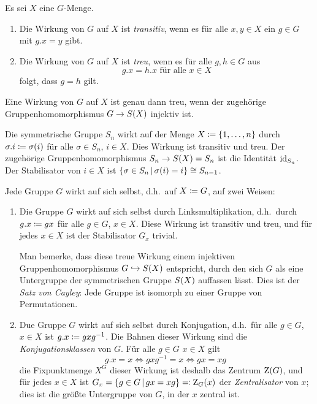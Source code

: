 \begin{definition}
  Es sei $X$ eine $G$-Menge.
  \begin{enumerate}
    \item
      Die Wirkung von $G$ auf $X$ ist \emph{transitiv}, wenn es für alle $x, y \in X$ ein $g \in G$ mit $g.x = y$ gibt.
    \item
      Die Wirkung von $G$ auf $X$ ist \emph{treu}, wenn es für alle $g, h \in G$ aus
      \[
        \text{$g.x = h.x$ für alle $x \in X$}
      \]
      folgt, dass $g = h$ gilt.
  \end{enumerate}
\end{definition}

\begin{remark}
  Eine Wirkung von $G$ auf $X$ ist genau dann treu, wenn der zugehörige Gruppenhomomorphismus $G \to S(X)$ injektiv ist.
\end{remark}

\begin{example}
  Die symmetrische Gruppe $S_n$ wirkt auf der Menge $X \coloneqq \{1, \dotsc, n\}$ durch $\sigma.i \coloneqq \sigma(i)$ für alle $\sigma \in S_n$, $i \in X$.
  Dies Wirkung ist transitiv und treu.
  Der zugehörige Gruppenhomomorphismus $S_n \to S(X) = S_n$ ist die Identität $\operatorname{id}_{S_n}$.
  Der Stabilisator von $i \in X$ ist $\{ \sigma \in S_n \suchthat \sigma(i) = i \} \cong S_{n-1}$.
\end{example}

\begin{example}
  Jede Gruppe $G$ wirkt auf sich selbst, d.h.\ auf $X \coloneqq G$, auf zwei Weisen:
  \begin{enumerate}
    \item
      Die Gruppe $G$ wirkt auf sich selbst durch Linksmultiplikation, d.h.\ durch $g.x \coloneqq gx$ für alle $g \in G$, $x \in X$.
      Diese Wirkung ist transitiv und treu, und für jedes $x \in X$ ist der Stabilisator $G_x$ trivial.
      
      Man bemerke, dass diese treue Wirkung einem injektiven Gruppenhomomorphismus $G \hookrightarrow S(X)$ entspricht, durch den sich $G$ als eine Untergruppe der symmetrischen Gruppe $S(X)$ auffassen lässt.
      Dies ist der \emph{Satz von Cayley}:
      Jede Gruppe ist isomorph zu einer Gruppe von Permutationen.
    \item
      Due Gruppe $G$ wirkt auf sich selbst durch Konjugation, d.h.\ für alle $g \in G$, $x \in X$ ist $g.x \coloneqq gxg^{-1}$.
      Die Bahnen dieser Wirkung sind die \emph{Konjugationsklassen} von $G$.
      Für alle $g \in G$ $x \in X$ gilt
      \[
          g.x
        = x
        \iff
          gxg^{-1}
        = x
        \iff
          gx
        = xg \;
      \]
      die Fixpunktmenge $X^G$ dieser Wirkung ist deshalb das Zentrum $\operatorname{Z}(G)$, und für jedes $x \in X$ ist $G_x = \{g \in G \suchthat gx = xg\} \eqqcolon \centralizer{G}{x}$ der \emph{Zentralisator} von $x$;
      dies ist die größte Untergruppe von $G$, in der $x$ zentral ist.
  \end{enumerate}
\end{example}



